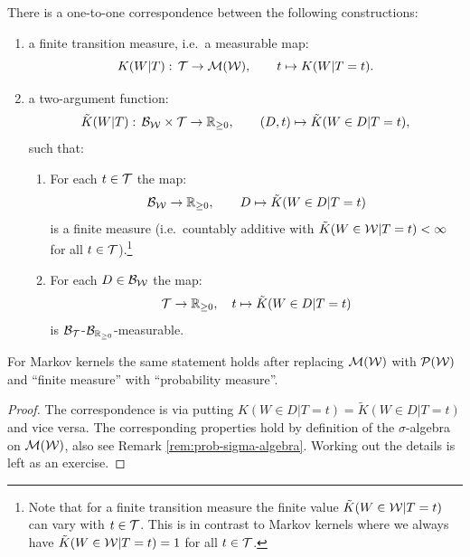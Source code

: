 \begin{Lem}\label{transmeasure_is_twoargfunction}
    There is a one-to-one correspondence between the following constructions:
    \begin{enumerate}
        \item a finite transition measure, i.e.\ a measurable map:
            \[ K(W|T):\, \mathcal{T} \to \mathcal{M}(\mathcal{W}),\qquad t \mapsto K(W|T=t).  \]
        \item a two-argument function:
        \[ \tilde K(W|T):\, \mathcal{B}_{\mathcal{W}} \times \mathcal{T} \to \mathbb{R}_{\ge 0}, \qquad (D,t) \mapsto \tilde K(W \in D|T=t),  \]
         such that:
    \begin{enumerate}[label=\roman*)]
        \item For each $t \in \mathcal{T}$ the map:
            \[ \mathcal{B}_{\mathcal{W}} \to \mathbb{R}_{\ge 0},\qquad D \mapsto \tilde K(W\in D|T=t)\]
            is a finite measure (i.e.\ countably additive with $\tilde K(W \in \mathcal{W}|T=t) < \infty$ for all $t \in \mathcal{T}$).\footnote{Note that for a finite transition measure the finite value $\tilde K(W \in \mathcal{W}|T=t)$ can vary with $t \in \mathcal{T}$. 
            This is in contrast to Markov kernels where we always have $\tilde K(W \in \mathcal{W}|T=t)=1$ for all $t \in \mathcal{T}$.}
        \item For each $D \in \mathcal{B}_{\mathcal{W}}$ the map:
            \[ \mathcal{T} \to \mathbb{R}_{\ge 0},\quad t \mapsto \tilde K(W \in D|T=t) \]
            is $\mathcal{B}_{\mathcal{T}}$-$\mathcal{B}_{\mathbb{R}_{\ge0}}$-measurable.
    \end{enumerate}
    \end{enumerate}
    For Markov kernels the same statement holds after replacing $\mathcal{M}(\mathcal{W})$ with $\mathcal{P}(\mathcal{W})$ and ``finite measure'' with ``probability measure''.
    \begin{proof}
        The correspondence is via putting $K(W \in D|T=t)=\tilde K(W \in D|T=t)$ and vice versa. 
        The corresponding properties hold by definition of the $\sigma$-algebra on $\mathcal{M}(\mathcal{W})$, 
        also see Remark \ref{rem:prob-sigma-algebra}.
        Working out the details is left as an exercise.
    \end{proof}
\end{Lem}



